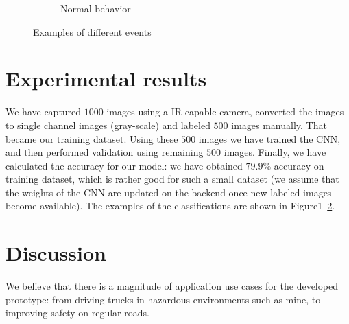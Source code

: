 \begin{figure}[ht!]
\begin{subfigure}{.3\textwidth}
            \caption{Normal behavior}
            \label{fig:sfig2}
          \end{subfigure}
        \caption{Examples of different events}
        \label{fig:classification}
        \end{figure}



\section{Experimental results}
\label{section:results}
We have captured $1000$ images using a IR-capable camera, converted the images to
single channel images (gray-scale) and labeled $500$ images manually. That became 
our training dataset. Using these $500$ images we have trained the CNN, and then 
performed validation using remaining $500$ images. Finally, we have calculated the 
accuracy for our model: we have obtained $79.9\%$ accuracy on training dataset, 
which is rather good for such a small dataset (we assume that the weights of the 
CNN are updated on the backend once new labeled images become available). The examples 
of the classifications are shown in Figure1~\ref{fig:classification}. 


\section{Discussion}
\label{section:results}
We believe that there is a magnitude of application use cases for the developed 
prototype: from driving trucks in hazardous environments such as mine, to improving 
safety on regular roads. 

